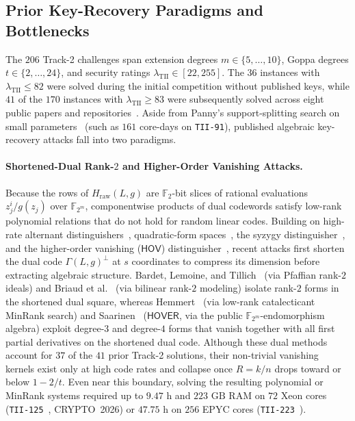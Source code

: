 \documentclass[11pt,a4paper]{article}
\theoremstyle{definition}
\theoremstyle{remark}
\newcommand{\F}{\mathbb{F}}
\newcommand{\HOV}{\mathsf{HOV}}
\newcommand{\HOVER}{\mathsf{HOVER}}
\begin{document}
\subsection{Prior Key-Recovery Paradigms and Bottlenecks}
The $206$ Track-2 challenges span extension degrees $m \in \{5, \dots, 10\}$, Goppa degrees $t \in \{2, \dots, 24\}$, and security ratings $\lambda_{\text{TII}} \in [22, 255]$. The $36$ instances with $\lambda_{\text{TII}} \le 82$ were solved during the initial competition without published keys, while $41$ of the $170$ instances with $\lambda_{\text{TII}} \ge 83$ were subsequently solved across eight public papers and repositories~\cite{Pan25,BLT26,BLRT26,Hem26,Ved26,Saa26a,Saa26b,SaaRepo,Wei26}. Aside from Panny's support-splitting search on small parameters~\cite{Pan25} (such as $161$ core-days on \texttt{TII-91}), published algebraic key-recovery attacks fall into two paradigms.

\paragraph{Shortened-Dual Rank-$2$ and Higher-Order Vanishing Attacks.}
Because the rows of $H_{\text{raw}}(L, g)$ are $\F_2$-bit slices of rational evaluations $z_j^i / g(z_j)$ over $\F_{2^m}$, componentwise products of dual codewords satisfy low-rank polynomial relations that do not hold for random linear codes. Building on high-rate alternant distinguishers~\cite{FGOPT13,CGGOT14}, quadratic-form spaces~\cite{CMT23}, the syzygy distinguisher~\cite{Ran25}, and the higher-order vanishing ($\HOV$) distinguisher~\cite{HW26}, recent attacks first shorten the dual code $\Gamma(L, g)^\perp$ at $s$ coordinates to compress its dimension before extracting algebraic structure. Bardet, Lemoine, and Tillich~\cite{BLT26} (via Pfaffian rank-$2$ ideals) and Briaud et al.~\cite{BLRT26} (via bilinear rank-$2$ modeling) isolate rank-$2$ forms in the shortened dual square, whereas Hemmert~\cite{Hem26} (via low-rank catalecticant MinRank search) and Saarinen~\cite{Saa26a} ($\HOVER$, via the public $\F_{2^m}$-endomorphism algebra) exploit degree-$3$ and degree-$4$ forms that vanish together with all first partial derivatives on the shortened dual code. Although these dual methods account for $37$ of the $41$ prior Track-2 solutions, their non-trivial vanishing kernels exist only at high code rates and collapse once $R = k/n$ drops toward or below $1 - 2/t$. Even near this boundary, solving the resulting polynomial or MinRank systems required up to $9.47\text{ h}$ and $223\text{ GB}$ RAM on $72$ Xeon cores (\texttt{TII-125}~\cite{BLT26}, CRYPTO~2026) or $47.75\text{ h}$ on $256$ EPYC cores (\texttt{TII-223}~\cite{Hem26}).
\end{document}
